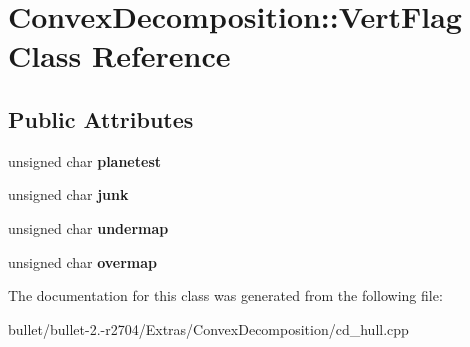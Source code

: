 \hypertarget{class_convex_decomposition_1_1_vert_flag}{\section{Convex\+Decomposition\+:\+:Vert\+Flag Class Reference}
\label{class_convex_decomposition_1_1_vert_flag}
}
\subsection*{Public Attributes}
\begin{DoxyCompactItemize}
\item 
\hypertarget{class_convex_decomposition_1_1_vert_flag_aa13bdf5f069a5e0be663b03b28f4ee2f}{unsigned char {\bfseries planetest}}\label{class_convex_decomposition_1_1_vert_flag_aa13bdf5f069a5e0be663b03b28f4ee2f}

\item 
\hypertarget{class_convex_decomposition_1_1_vert_flag_a633e79f3d7099beb7b0605aeb3ea5fec}{unsigned char {\bfseries junk}}\label{class_convex_decomposition_1_1_vert_flag_a633e79f3d7099beb7b0605aeb3ea5fec}

\item 
\hypertarget{class_convex_decomposition_1_1_vert_flag_a026bde7eee0cc41001fa83c77a94ff32}{unsigned char {\bfseries undermap}}\label{class_convex_decomposition_1_1_vert_flag_a026bde7eee0cc41001fa83c77a94ff32}

\item 
\hypertarget{class_convex_decomposition_1_1_vert_flag_a4586bfd82115173977ffbf0f21a34750}{unsigned char {\bfseries overmap}}\label{class_convex_decomposition_1_1_vert_flag_a4586bfd82115173977ffbf0f21a34750}

\end{DoxyCompactItemize}


The documentation for this class was generated from the following file\+:\begin{DoxyCompactItemize}
\item 
bullet/bullet-\/2.-\/r2704/\+Extras/\+Convex\+Decomposition/cd\+\_\+hull.\+cpp\end{DoxyCompactItemize}
